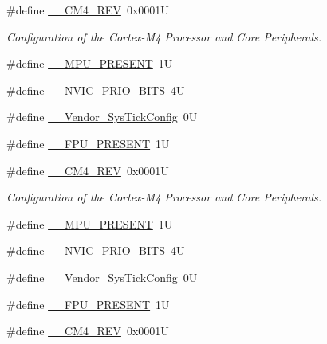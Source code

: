 \begin{DoxyCompactItemize}
\item 
\#define \hyperlink{group___configuration__section__for___c_m_s_i_s_ga45a97e4bb8b6ce7c334acc5f45ace3ba}{\+\_\+\+\_\+\+C\+M4\+\_\+\+R\+EV}~0x0001U
\begin{DoxyCompactList}\small\item\em Configuration of the Cortex-\/\+M4 Processor and Core Peripherals. \end{DoxyCompactList}\item 
\#define \hyperlink{group___configuration__section__for___c_m_s_i_s_ga4127d1b31aaf336fab3d7329d117f448}{\+\_\+\+\_\+\+M\+P\+U\+\_\+\+P\+R\+E\+S\+E\+NT}~1U
\item 
\#define \hyperlink{group___configuration__section__for___c_m_s_i_s_gae3fe3587d5100c787e02102ce3944460}{\+\_\+\+\_\+\+N\+V\+I\+C\+\_\+\+P\+R\+I\+O\+\_\+\+B\+I\+TS}~4U
\item 
\#define \hyperlink{group___configuration__section__for___c_m_s_i_s_gab58771b4ec03f9bdddc84770f7c95c68}{\+\_\+\+\_\+\+Vendor\+\_\+\+Sys\+Tick\+Config}~0U
\item 
\#define \hyperlink{group___configuration__section__for___c_m_s_i_s_gac1ba8a48ca926bddc88be9bfd7d42641}{\+\_\+\+\_\+\+F\+P\+U\+\_\+\+P\+R\+E\+S\+E\+NT}~1U
\item 
\#define \hyperlink{group___configuration__section__for___c_m_s_i_s_ga45a97e4bb8b6ce7c334acc5f45ace3ba}{\+\_\+\+\_\+\+C\+M4\+\_\+\+R\+EV}~0x0001U
\begin{DoxyCompactList}\small\item\em Configuration of the Cortex-\/\+M4 Processor and Core Peripherals. \end{DoxyCompactList}\item 
\#define \hyperlink{group___configuration__section__for___c_m_s_i_s_ga4127d1b31aaf336fab3d7329d117f448}{\+\_\+\+\_\+\+M\+P\+U\+\_\+\+P\+R\+E\+S\+E\+NT}~1U
\item 
\#define \hyperlink{group___configuration__section__for___c_m_s_i_s_gae3fe3587d5100c787e02102ce3944460}{\+\_\+\+\_\+\+N\+V\+I\+C\+\_\+\+P\+R\+I\+O\+\_\+\+B\+I\+TS}~4U
\item 
\#define \hyperlink{group___configuration__section__for___c_m_s_i_s_gab58771b4ec03f9bdddc84770f7c95c68}{\+\_\+\+\_\+\+Vendor\+\_\+\+Sys\+Tick\+Config}~0U
\item 
\#define \hyperlink{group___configuration__section__for___c_m_s_i_s_gac1ba8a48ca926bddc88be9bfd7d42641}{\+\_\+\+\_\+\+F\+P\+U\+\_\+\+P\+R\+E\+S\+E\+NT}~1U
\item 
\#define \hyperlink{group___configuration__section__for___c_m_s_i_s_ga45a97e4bb8b6ce7c334acc5f45ace3ba}{\+\_\+\+\_\+\+C\+M4\+\_\+\+R\+EV}~0x0001U

\end{DoxyCompactItemize}
